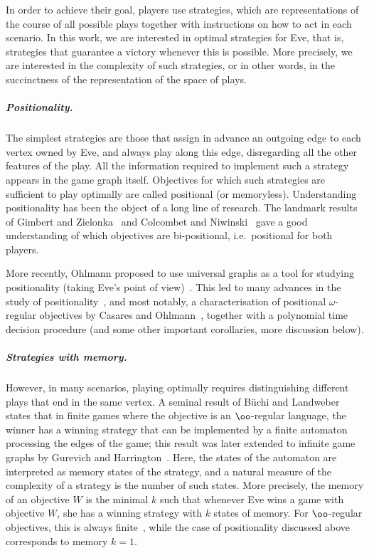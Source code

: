 In order to achieve their goal, players use strategies, which are representations of the course of all possible plays together with instructions on how to act in each scenario.
In this work, we are interested in optimal strategies for Eve, that is, strategies that guarantee a victory whenever this is possible. More precisely, we are interested in the complexity of such strategies, or in other words, in the succinctness of the representation of the space of plays.

\subparagraph*{Positionality.}
The simplest strategies are those that assign in advance an outgoing edge to each vertex owned by Eve, and always play along this edge, disregarding all the other features of the play.
All the information required to implement such a strategy appears in the game graph itself.
Objectives for which such strategies are sufficient to play optimally are called positional (or memoryless).
Understanding positionality has been the object of a long line of research. The landmark results of Gimbert and Zielonka~\cite{GZ05} and Colcombet and Niwinski~\cite{CN06} gave a good understanding of which objectives are bi-positional, %
i.e.~positional for both players.

More recently, Ohlmann proposed to use universal graphs as a tool for studying positionality (taking  Eve's point of view)~\cite{Ohlmann23}.
This led to many advances in the study of positionality~\cite{BCRV24HalfJournal,OS24Sigma2}, and most notably, a characterisation of positional $\omega$-regular objectives by Casares and Ohlmann~\cite{CO24Positional}, together with a polynomial time decision procedure (and some other important corollaries, more discussion below).

\subparagraph*{Strategies with memory.} 
However, in many scenarios, playing optimally requires distinguishing different plays that end in the same vertex.
A seminal result of B\"uchi and Landweber~\cite{BL69Strategies} states that in finite games where the objective is an $\oo$-regular language, the winner has a winning strategy that can be implemented by a finite automaton processing the edges of the game; this result was later extended to infinite game graphs by Gurevich and Harrington~\cite{Gurevich1982trees}.
Here, the states of the automaton are interpreted as memory states of the strategy, and a natural measure of the complexity of a strategy is the number of such states.
More precisely, the memory of an objective $W$ is the minimal $k$ such that whenever Eve wins a game with objective $W$, she has a winning strategy with $k$ states of memory.
For $\oo$-regular objectives, this is always finite~\cite{BL69Strategies,Gurevich1982trees}, while the case of positionality discussed above corresponds to memory $k=1$.

